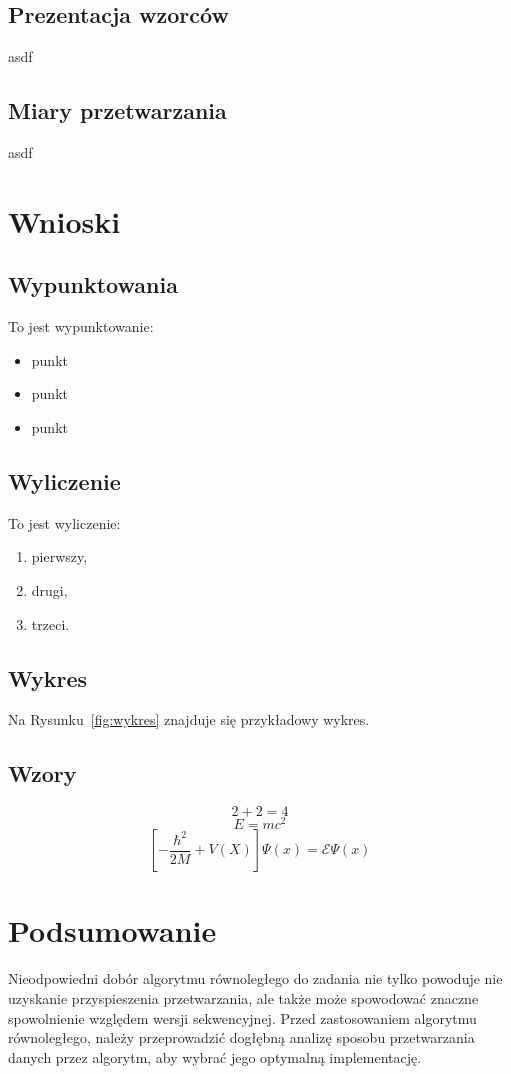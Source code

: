 \documentclass{article}
\begin{document}
\subsection{Prezentacja wzorców}
asdf
\subsection{Miary przetwarzania}
asdf

\section{Wnioski}



\subsection{Wypunktowania}
To jest wypunktowanie:
\begin{itemize}
\item punkt
\item punkt
\item punkt
\end{itemize}
\subsection{Wyliczenie}
To jest wyliczenie:
\begin{enumerate}
\item pierwszy,
\item drugi,
\item trzeci.
\end{enumerate}
\subsection{Wykres}
Na Rysunku~\ref{fig:wykres} znajduje się przykładowy wykres.
\subsection{Wzory}
\begin{equation}
2 + 2 = 4
\end{equation}
\begin{equation}
E = mc^2
\end{equation}
\begin{equation}
\left[- \frac{\hbar^2}{2M} + V(X) \right] \Psi(x)=  \mathcal{E} \Psi(x)
\end{equation}

\section{Podsumowanie}
Nieodpowiedni dobór algorytmu równoległego do zadania nie tylko powoduje nie uzyskanie przyspieszenia przetwarzania, ale także może spowodować znaczne spowolnienie względem wersji sekwencyjnej. Przed zastosowaniem algorytmu równoległego, należy przeprowadzić dogłębną analizę sposobu przetwarzania danych przez algorytm, aby wybrać jego optymalną implementację.
\end{document}

